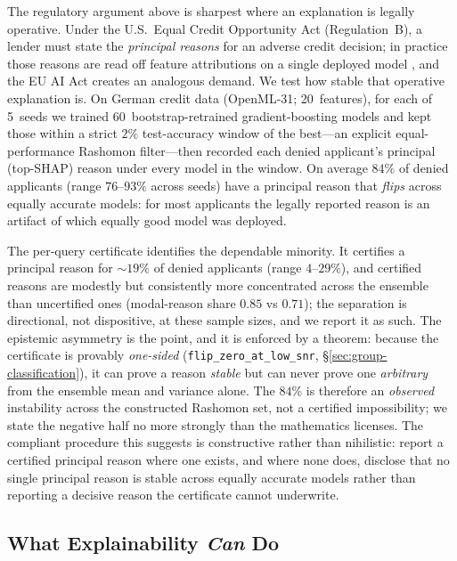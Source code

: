 \documentclass[11pt,a4paper]{article}
\newcommand{\SHAP}{\textsc{SHAP}}
\begin{document}
The regulatory argument above is sharpest where an explanation is legally
operative. Under the U.S.\ Equal Credit Opportunity Act (Regulation~B), a lender
must state the \emph{principal reasons} for an adverse credit decision; in
practice those reasons are read off feature attributions on a single deployed
model \citep{selbst2018intuitive,ustun2019actionable}, and the EU AI Act
\citep{euaiact2024} creates an analogous demand. We test how stable that
operative explanation is. On German credit data (OpenML-31; 20~features), for
each of 5~seeds we trained 60~bootstrap-retrained gradient-boosting models and
kept those within a strict $2\%$ test-accuracy window of the best---an explicit
equal-performance Rashomon filter---then recorded each denied applicant's
principal (top-\SHAP{}) reason under every model in the window. On average
$84\%$ of denied applicants (range $76$--$93\%$ across seeds) have a principal
reason that \emph{flips} across equally accurate models: for most applicants the
legally reported reason is an artifact of which equally good model was deployed.

The per-query certificate identifies the dependable minority. It certifies a
principal reason for ${\sim}19\%$ of denied applicants (range $4$--$29\%$), and
certified reasons are modestly but consistently more concentrated across the
ensemble than uncertified ones (modal-reason share $0.85$ vs $0.71$); the
separation is directional, not dispositive, at these sample sizes, and we report
it as such. The epistemic asymmetry is the point, and it is enforced by a
theorem: because the certificate is provably \emph{one-sided}
(\texttt{flip\_zero\_at\_low\_snr}, \S\ref{sec:group-classification}), it can
prove a reason \emph{stable} but can never prove one \emph{arbitrary} from the
ensemble mean and variance alone. The $84\%$ is therefore an \emph{observed}
instability across the constructed Rashomon set, not a certified impossibility;
we state the negative half no more strongly than the mathematics licenses. The
compliant procedure this suggests is constructive rather than nihilistic: report
a certified principal reason where one exists, and where none does, disclose
that no single principal reason is stable across equally accurate models rather
than reporting a decisive reason the certificate cannot underwrite.

\subsection[What Explainability Can Do]{What Explainability \emph{Can} Do}
\label{sec:can-do}
\end{document}
